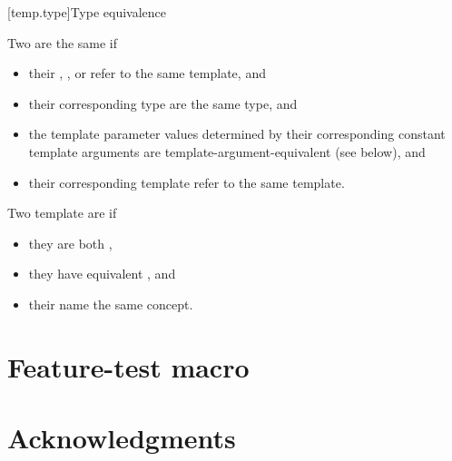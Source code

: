 \documentclass{wg21}
\begin{document}
[temp.type]{Type equivalence}

\pnum
{}%
Two  are the same if
\begin{itemize}
\item
their ,
, or
refer to the same template, and

\item
their corresponding type 
are the same type, and

\item
the template parameter values determined by
their corresponding constant template arguments 
are template-argument-equivalent (see below), and

\item
their corresponding template 
refer to the same template.
\end{itemize}


\begin{addedblock}
Two template  are  if
\begin{itemize}
\item they are both ,
\item they have equivalent , and
\item their  name the same concept.
\end{itemize}
\end{addedblock}



\section{Feature-test macro}




\section{Acknowledgments}
\end{document}
